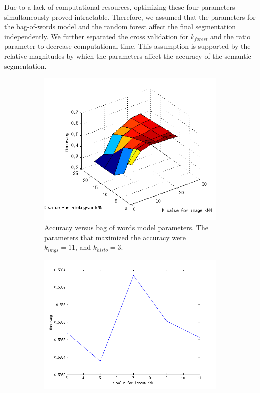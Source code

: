 \documentclass{article} %
\begin{document}
Due to a lack of computational resources, optimizing these four parameters simultaneously proved intractable. Therefore, we assumed that the parameters for the bag-of-words model and the random forest affect the final segmentation independently. We further separated the cross validation for $k_{forest}$ and the ratio parameter to decrease computational time. This assumption is supported by the relative magnitudes by which the parameters affect the accuracy of the semantic segmentation.

\begin{figure}[htb]
\centering
	\begin{subfigure}[t]{0.33\textwidth}
		\centering
		\includegraphics[width = \textwidth]{./img/pickK3}
		\parbox{.95\textwidth}{\caption{Accuracy versus bag of words model parameters. The parameters that maximized the accuracy were $k_{imgs} = 11$, and $k_{histo} = 3$. \label{fig:Kbag} }}
			\end{subfigure}
	\begin{subfigure}[t]{0.33\textwidth}
		\centering
		\includegraphics[width = \textwidth]{./img/kforest}

\end{subfigure}
\end{figure}
\end{document}
